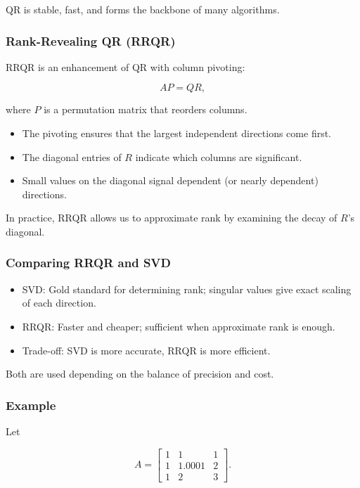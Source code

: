 \documentclass[
  letterpaper,
  DIV=11,
  numbers=noendperiod]{scrreprt}
\providecommand{\tightlist}{%
  \setlength{\itemsep}{0pt}\setlength{\parskip}{0pt}}
\begin{document}
QR is stable, fast, and forms the backbone of many algorithms.

\subsubsection{Rank-Revealing QR (RRQR)}\label{rank-revealing-qr-rrqr}

RRQR is an enhancement of QR with column pivoting:

\[
A P = Q R,
\]

where \(P\) is a permutation matrix that reorders columns.

\begin{itemize}
\tightlist
\item
  The pivoting ensures that the largest independent directions come
  first.
\item
  The diagonal entries of \(R\) indicate which columns are significant.
\item
  Small values on the diagonal signal dependent (or nearly dependent)
  directions.
\end{itemize}

In practice, RRQR allows us to approximate rank by examining the decay
of \(R\)'s diagonal.

\subsubsection{Comparing RRQR and SVD}\label{comparing-rrqr-and-svd}

\begin{itemize}
\tightlist
\item
  SVD: Gold standard for determining rank; singular values give exact
  scaling of each direction.
\item
  RRQR: Faster and cheaper; sufficient when approximate rank is enough.
\item
  Trade-off: SVD is more accurate, RRQR is more efficient.
\end{itemize}

Both are used depending on the balance of precision and cost.

\subsubsection{Example}\label{example-5}

Let

\[
A = \begin{bmatrix}1 & 1 & 1 \\ 1 & 1.0001 & 2 \\ 1 & 2 & 3\end{bmatrix}.
\]
\end{document}
